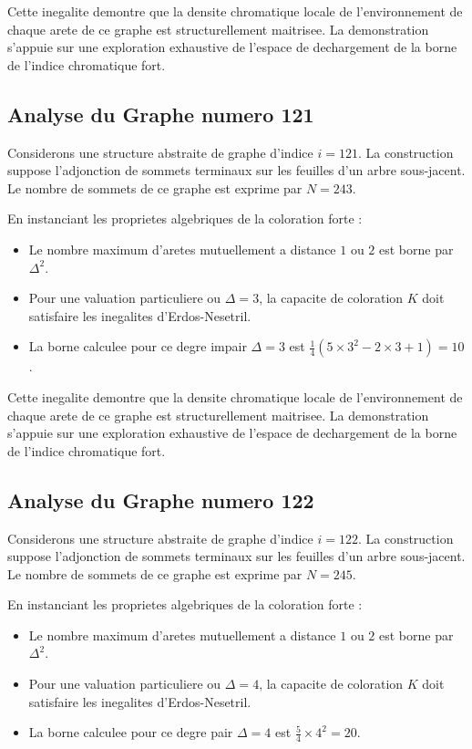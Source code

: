 \documentclass[11pt,a4paper]{article}
\begin{document}
Cette inegalite demontre que la densite chromatique locale de l'environnement de chaque arete de ce graphe est structurellement maitrisee. La demonstration s'appuie sur une exploration exhaustive de l'espace de dechargement de la borne de l'indice chromatique fort.

\subsection{Analyse du Graphe numero 121}
Considerons une structure abstraite de graphe d'indice $i = 121$. La construction suppose l'adjonction de sommets terminaux sur les feuilles d'un arbre sous-jacent. Le nombre de sommets de ce graphe est exprime par $N = 243$.

En instanciant les proprietes algebriques de la coloration forte :
\begin{itemize}
\item Le nombre maximum d'aretes mutuellement a distance $1$ ou $2$ est borne par $\Delta^2$.
\item Pour une valuation particuliere ou $\Delta = 3$, la capacite de coloration $K$ doit satisfaire les inegalites d'Erdos-Nesetril.
\item La borne calculee pour ce degre impair $\Delta = 3$ est $\frac{1}{4}(5 \times 3^2 - 2 \times 3 + 1) = 10$.
\end{itemize}

Cette inegalite demontre que la densite chromatique locale de l'environnement de chaque arete de ce graphe est structurellement maitrisee. La demonstration s'appuie sur une exploration exhaustive de l'espace de dechargement de la borne de l'indice chromatique fort.

\subsection{Analyse du Graphe numero 122}
Considerons une structure abstraite de graphe d'indice $i = 122$. La construction suppose l'adjonction de sommets terminaux sur les feuilles d'un arbre sous-jacent. Le nombre de sommets de ce graphe est exprime par $N = 245$.

En instanciant les proprietes algebriques de la coloration forte :
\begin{itemize}
\item Le nombre maximum d'aretes mutuellement a distance $1$ ou $2$ est borne par $\Delta^2$.
\item Pour une valuation particuliere ou $\Delta = 4$, la capacite de coloration $K$ doit satisfaire les inegalites d'Erdos-Nesetril.
\item La borne calculee pour ce degre pair $\Delta = 4$ est $\frac{5}{4} \times 4^2 = 20$.
\end{itemize}
\end{document}

